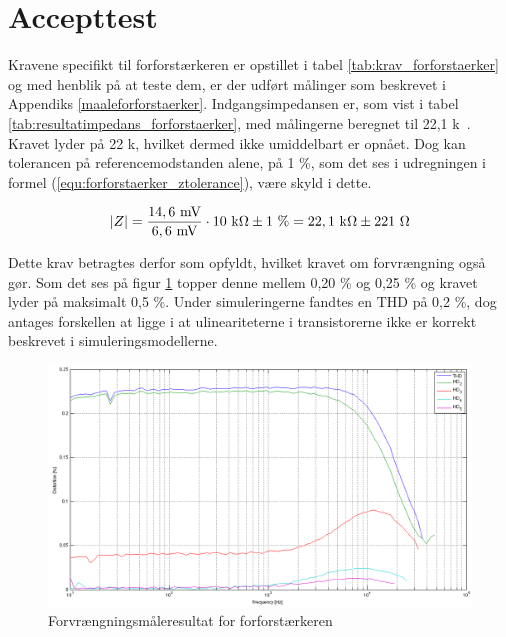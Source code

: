 \section{Accepttest}
\label{forforstaerker_accepttest}

Kravene specifikt til forforstærkeren er opstillet i tabel \ref{tab:krav_forforstaerker} og med henblik på at teste dem, er der udført målinger som beskrevet i Appendiks \ref{maaleforforstaerker}. Indgangsimpedansen er, som vist i tabel \ref{tab:resultatimpedans_forforstaerker}, med målingerne beregnet til 22,1 k\ohm~. Kravet lyder på 22 k\ohm, hvilket dermed ikke umiddelbart er opnået. Dog kan tolerancen på referencemodstanden alene, på 1 \%, som det ses i udregningen i formel (\ref{equ:forforstaerker_ztolerance}), være skyld i dette.

\begin{equation}
\label{equ:forforstaerker_ztolerance}
\vert Z \vert = \frac{\mathrm{14,6~mV}}{\mathrm{6,6~mV}} \cdot \mathrm{10~k\ohm} \pm 1~\% =  \mathrm{22,1~k\ohm} \pm 221~\ohm
\end{equation}

Dette krav betragtes derfor som opfyldt, hvilket kravet om forvrængning også gør. Som det ses på figur \ref{fig:accepttest-thdresultat-forforstaerker} topper denne mellem 0,20 \% og 0,25 \% og kravet lyder på maksimalt 0,5 \%. Under simuleringerne fandtes en THD på 0,2 \%, dog antages forskellen at ligge i at ulineariteterne i transistorerne ikke er korrekt beskrevet i simuleringsmodellerne. 

\begin{figure}[h]
\centering
\includegraphics[scale=0.3]{maalerapporter/forforstaerker/thd-forforstaerker.png}
\caption{Forvrængningsmåleresultat for forforstærkeren}
\label{fig:accepttest-thdresultat-forforstaerker}
\end{figure}

